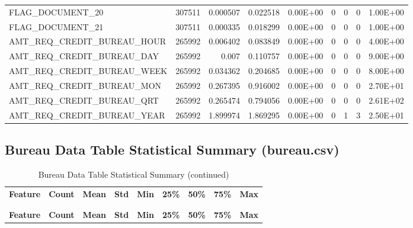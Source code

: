 \documentclass[12pt, letterpaper]{article}
\begin{document}
\begin{appendices}
{\begin{longtable}[c]{| l || r | r | r | r | r | r | r | r |}
 FLAG_DOCUMENT_20	&	307511	&	0.000507	&	0.022518	&	0.00E+00	&	0	&	0	&	0	&	1.00E+00	\\
 FLAG_DOCUMENT_21	&	307511	&	0.000335	&	0.018299	&	0.00E+00	&	0	&	0	&	0	&	1.00E+00	\\
 AMT_REQ_CREDIT_BUREAU_HOUR	&	265992	&	0.006402	&	0.083849	&	0.00E+00	&	0	&	0	&	0	&	4.00E+00	\\
 AMT_REQ_CREDIT_BUREAU_DAY	&	265992	&	0.007	&	0.110757	&	0.00E+00	&	0	&	0	&	0	&	9.00E+00	\\
 AMT_REQ_CREDIT_BUREAU_WEEK	&	265992	&	0.034362	&	0.204685	&	0.00E+00	&	0	&	0	&	0	&	8.00E+00	\\
 AMT_REQ_CREDIT_BUREAU_MON	&	265992	&	0.267395	&	0.916002	&	0.00E+00	&	0	&	0	&	0	&	2.70E+01	\\
 AMT_REQ_CREDIT_BUREAU_QRT	&	265992	&	0.265474	&	0.794056	&	0.00E+00	&	0	&	0	&	0	&	2.61E+02	\\
 AMT_REQ_CREDIT_BUREAU_YEAR	&	265992	&	1.899974	&	1.869295	&	0.00E+00	&	0	&	1	&	3	&	2.50E+01	\\
\end{longtable}
}
\normalsize

\subsection{Bureau Data Table Statistical Summary (bureau.csv)}
\label{appendix:bureaudatatablestatsummary}

\tiny
{}
{
\begin{longtable}[c]{| l || r | r | r | r | r | r | r | r |}

 \caption{Bureau Data Table Statistical Summary\label{bureaudatatablestatsummary}}\\

 \hline
 \rowcolor{white} \multicolumn{9}{| c |}{\textbf{bureau.csv Feature Statistics}}\\
 \hline
 \rowcolor{white} \textbf{Feature} & \textbf{Count} & \textbf{Mean} & \textbf{Std} & \textbf{Min} & \textbf{25\%} & \textbf{50\%} & \textbf{75\%} & \textbf{Max}\\
 \hline
 \endfirsthead

 \rowcolor{white} \caption[]{Bureau Data Table Statistical Summary (continued)}\\
 \rowcolor{white} \hline
 \rowcolor{white} \multicolumn{9}{|c|}{\textbf{bureau.csv Feature Statistics}\ref{bureaudatatablestatsummary}}\\
 \hline
 \rowcolor{white} \textbf{Feature} & \textbf{Count} & \textbf{Mean} & \textbf{Std} & \textbf{Min} & \textbf{25\%} & \textbf{50\%} & \textbf{75\%} & \textbf{Max}\\
 \hline
 \endhead


\end{longtable}}
\end{appendices}
\end{document}
